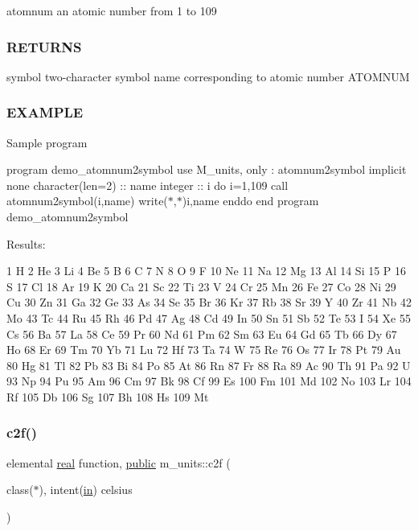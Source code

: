 atomnum an atomic number from 1 to 109

\subsubsection*{R\+E\+T\+U\+R\+NS}

symbol two-\/character symbol name corresponding to atomic number A\+T\+O\+M\+N\+UM

\subsubsection*{E\+X\+A\+M\+P\+LE}

Sample program

program demo\+\_\+atomnum2symbol use M\+\_\+units, only \+: atomnum2symbol implicit none character(len=2) \+:\+: name integer \+:\+: i do i=1,109 call atomnum2symbol(i,name) write($\ast$,$\ast$)i,name enddo end program demo\+\_\+atomnum2symbol

Results\+: \begin{DoxyVerb}     1 H
     2 He
     3 Li
     4 Be
     5 B
     6 C
     7 N
     8 O
     9 F
    10 Ne
    11 Na
    12 Mg
    13 Al
    14 Si
    15 P
    16 S
    17 Cl
    18 Ar
    19 K
    20 Ca
    21 Sc
    22 Ti
    23 V
    24 Cr
    25 Mn
    26 Fe
    27 Co
    28 Ni
    29 Cu
    30 Zn
    31 Ga
    32 Ge
    33 As
    34 Se
    35 Br
    36 Kr
    37 Rb
    38 Sr
    39 Y
    40 Zr
    41 Nb
    42 Mo
    43 Tc
    44 Ru
    45 Rh
    46 Pd
    47 Ag
    48 Cd
    49 In
    50 Sn
    51 Sb
    52 Te
    53 I
    54 Xe
    55 Cs
    56 Ba
    57 La
    58 Ce
    59 Pr
    60 Nd
    61 Pm
    62 Sm
    63 Eu
    64 Gd
    65 Tb
    66 Dy
    67 Ho
    68 Er
    69 Tm
    70 Yb
    71 Lu
    72 Hf
    73 Ta
    74 W
    75 Re
    76 Os
    77 Ir
    78 Pt
    79 Au
    80 Hg
    81 Tl
    82 Pb
    83 Bi
    84 Po
    85 At
    86 Rn
    87 Fr
    88 Ra
    89 Ac
    90 Th
    91 Pa
    92 U
    93 Np
    94 Pu
    95 Am
    96 Cm
    97 Bk
    98 Cf
    99 Es
   100 Fm
   101 Md
   102 No
   103 Lr
   104 Rf
   105 Db
   106 Sg
   107 Bh
   108 Hs
   109 Mt \end{DoxyVerb}
 \mbox{\label{namespacem__units_a652a2565824ce7cbc692b563054ffa3e}} 
\subsubsection{\texorpdfstring{c2f()}{c2f()}}
{\footnotesize\ttfamily elemental \hyperlink{read__watch_83_8txt_abdb62bde002f38ef75f810d3a905a823}{real} function, \hyperlink{M__stopwatch_83_8txt_a2f74811300c361e53b430611a7d1769f}{public} m\+\_\+units\+::c2f (\begin{DoxyParamCaption}\item[{class($\ast$), intent(\hyperlink{M__journal_83_8txt_afce72651d1eed785a2132bee863b2f38}{in})}]{celsius }\end{DoxyParamCaption})}



